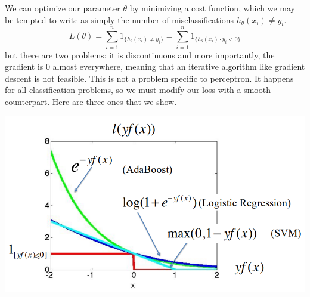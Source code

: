 \documentclass{article}
\theoremstyle{definition}
\begin{document}
  We can optimize our parameter $\theta$ by minimizing a cost function, which we may be tempted to write as simply the number of misclassifications $h_\theta (x_i) \neq y_i$. 
  \[L(\theta) = \sum_{i=1}^n 1_{\{h_\theta (x_i) \neq y_i\}} = \sum_{i=1}^n 1_{\{h_\theta (x_i) \cdot y_i < 0\}}\]
  but there are two problems: it is discontinuous and more importantly, the gradient is $0$ almost everywhere, meaning that an iterative algorithm like gradient descent is not feasible. This is not a problem specific to perceptron. It happens for all classification problems, so we must modify our loss with a smooth counterpart. Here are three ones that we show. 
  \begin{center}
      \includegraphics[scale=0.35]{loss_functions_class.png}
  \end{center}
\end{document}
